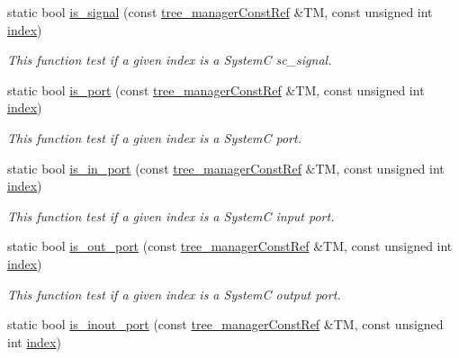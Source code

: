 \begin{Indent}
\begin{DoxyCompactItemize}
static bool \hyperlink{classtree__helper_a2fb7f7a48d5444d13e98ec948eb44ce1}{is\+\_\+signal} (const \hyperlink{tree__manager_8hpp_a792e3f1f892d7d997a8d8a4a12e39346}{tree\+\_\+manager\+Const\+Ref} \&TM, const unsigned int \hyperlink{tutorial__pact__2019_2Introduction_2third_2include_2Keccak_8h_a028c9bdc8344cca38ab522a337074797}{index})
\begin{DoxyCompactList}\small\item\em This function test if a given index is a SystemC sc\+\_\+signal. \end{DoxyCompactList}\item 
static bool \hyperlink{classtree__helper_ab05d299651f0c54fa25b26b8446c26d5}{is\+\_\+port} (const \hyperlink{tree__manager_8hpp_a792e3f1f892d7d997a8d8a4a12e39346}{tree\+\_\+manager\+Const\+Ref} \&TM, const unsigned int \hyperlink{tutorial__pact__2019_2Introduction_2third_2include_2Keccak_8h_a028c9bdc8344cca38ab522a337074797}{index})
\begin{DoxyCompactList}\small\item\em This function test if a given index is a SystemC port. \end{DoxyCompactList}\item 
static bool \hyperlink{classtree__helper_abb9469aca01d23ad785ffac3b5ce64de}{is\+\_\+in\+\_\+port} (const \hyperlink{tree__manager_8hpp_a792e3f1f892d7d997a8d8a4a12e39346}{tree\+\_\+manager\+Const\+Ref} \&TM, const unsigned int \hyperlink{tutorial__pact__2019_2Introduction_2third_2include_2Keccak_8h_a028c9bdc8344cca38ab522a337074797}{index})
\begin{DoxyCompactList}\small\item\em This function test if a given index is a SystemC input port. \end{DoxyCompactList}\item 
static bool \hyperlink{classtree__helper_a28c813825d5b4e548775c72d511af4eb}{is\+\_\+out\+\_\+port} (const \hyperlink{tree__manager_8hpp_a792e3f1f892d7d997a8d8a4a12e39346}{tree\+\_\+manager\+Const\+Ref} \&TM, const unsigned int \hyperlink{tutorial__pact__2019_2Introduction_2third_2include_2Keccak_8h_a028c9bdc8344cca38ab522a337074797}{index})
\begin{DoxyCompactList}\small\item\em This function test if a given index is a SystemC output port. \end{DoxyCompactList}\item 
static bool \hyperlink{classtree__helper_aca402a84a9a7795074b170a5bc578a69}{is\+\_\+inout\+\_\+port} (const \hyperlink{tree__manager_8hpp_a792e3f1f892d7d997a8d8a4a12e39346}{tree\+\_\+manager\+Const\+Ref} \&TM, const unsigned int \hyperlink{tutorial__pact__2019_2Introduction_2third_2include_2Keccak_8h_a028c9bdc8344cca38ab522a337074797}{index})

\end{DoxyCompactItemize}
\end{Indent}
